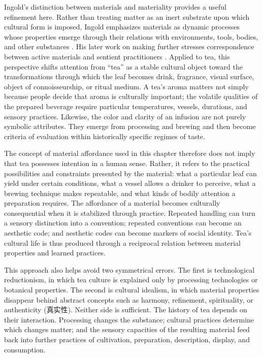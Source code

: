 \documentclass[numbers]{IntechOpen-Book}
\newcommand{\zh}[1]{{\CJKfontspec{Noto Serif CJK SC}\upshape #1}}
\begin{document}
Ingold's distinction between materials and materiality provides a useful refinement here. Rather than treating matter as an inert substrate upon which cultural form is imposed, Ingold emphasizes materials as dynamic processes whose properties emerge through their relations with environments, tools, bodies, and other substances \cite{ingoldmaterials}. His later work on making further stresses correspondence between active materials and sentient practitioners \cite{ingoldmaking}. Applied to tea, this perspective shifts attention from ``tea'' as a stable cultural object toward the transformations through which the leaf becomes drink, fragrance, visual surface, object of connoisseurship, or ritual medium. A tea's aroma matters not simply because people decide that aroma is culturally important; the volatile qualities of the prepared beverage require particular temperatures, vessels, durations, and sensory practices. Likewise, the color and clarity of an infusion are not purely symbolic attributes. They emerge from processing and brewing and then become criteria of evaluation within historically specific regimes of taste.

The concept of material affordance used in this chapter therefore does not imply that tea possesses intention in a human sense. Rather, it refers to the practical possibilities and constraints presented by the material: what a particular leaf can yield under certain conditions, what a vessel allows a drinker to perceive, what a brewing technique makes repeatable, and what kinds of bodily attention a preparation requires. The affordance of a material becomes culturally consequential when it is stabilized through practice. Repeated handling can turn a sensory distinction into a convention; repeated conventions can become an aesthetic code; and aesthetic codes can become markers of social identity. Tea's cultural life is thus produced through a reciprocal relation between material properties and learned practices.

This approach also helps avoid two symmetrical errors. The first is technological reductionism, in which tea culture is explained only by processing technologies or botanical properties. The second is cultural idealism, in which material properties disappear behind abstract concepts such as harmony, refinement, spirituality, or authenticity (\zh{真实性}). Neither side is sufficient. The history of tea depends on their interaction. Processing changes the substance; cultural practices determine which changes matter; and the sensory capacities of the resulting material feed back into further practices of cultivation, preparation, description, display, and consumption.
\end{document}
